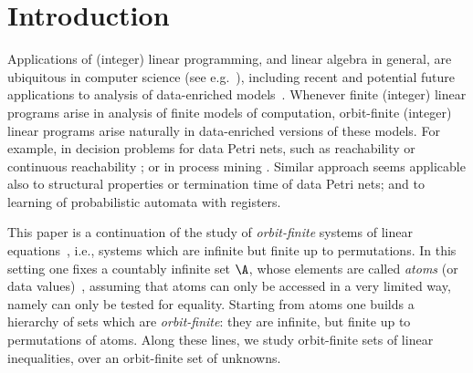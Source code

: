 

\section{Introduction}
\label{sec:intro}
Applications of (integer) linear programming, and linear algebra in general, 
are ubiquitous in computer science (see e.g.~\cite{SilvaTC96,Cormenbook,Colcombet15}),
including recent and potential future applications to analysis of data-enriched 
models~\cite{HLT17,HL18,GSAH19,BKM21}.
%
Whenever finite (integer) linear programs arise in analysis of finite models of computation, 
   orbit-finite (integer) linear programs arise naturally in data-enriched versions of these models.
   For example, in decision problems for data Petri nets, such as reachability \cite{Nets-with-Tokens-which-Carry-Data} or
   continuous reachability \cite{GSAH19}; or in process mining \cite{WDHS08}.
Similar approach seems applicable also to
   structural properties or termination time of data Petri nets; and to  
   learning of probabilistic automata with registers.
   
This paper is a continuation of the study of \emph{orbit-finite} systems of linear equations~\cite{GHL22},
i.e., systems which are infinite but finite up to permutations.
In this setting one fixes a countably infinite set $\A$, %
whose elements are called \emph{atoms} (or data values)~\cite{atombook,Pitts:book}, 
assuming that atoms can only be accessed in a very limited way, namely can only be tested for equality.
Starting from atoms one builds a hierarchy of sets which are \emph{orbit-finite}: they are infinite, but finite up to permutations of atoms.
Along these lines, we study orbit-finite sets of linear inequalities, over an orbit-finite set of unknowns.



